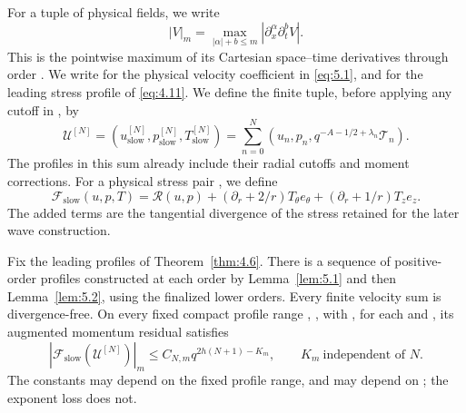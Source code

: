 %
For a tuple  of physical fields, we write
\begin{equation}
 |V|_m=\max_{|\alpha|+b\leq m}|\partial_x^\alpha\partial_t^bV|.
 \tag{5.23}\label{eq:5.23}
\end{equation}
This is the pointwise maximum of its Cartesian space--time derivatives through order
. We write
 for the physical velocity
coefficient in \eqref{eq:5.1}, and  for the leading stress profile of
\eqref{eq:4.11}. We define the finite tuple, before applying any cutoff in
, by
\[
 \mathcal U^{[N]}=
 (u_{\mathrm{slow}}^{[N]},p_{\mathrm{slow}}^{[N]},T_{\mathrm{slow}}^{[N]})
 =\sum_{n=0}^{N}(u_n,p_n,q^{-A-1/2+\lambda_n}\mathcal T_n).
\]
The profiles in this sum already include their radial cutoffs and moment corrections. For a
physical stress pair , we define
\begin{equation}
 \mathcal F_{\mathrm{slow}}(u,p,T)=\mathscr R(u,p)
 +(\partial_r+2/r)T_\theta e_\theta+(\partial_r+1/r)T_ze_z.
 \tag{5.24}\label{eq:5.24}
\end{equation}
The added terms are the tangential divergence of the stress retained for the later wave
construction.

\begin{proposition}\label{prop:5.3}
Fix the leading profiles of Theorem~\ref{thm:4.6}. There is a sequence of positive-order profiles
constructed at each order by Lemma~\ref{lem:5.1} and then Lemma~\ref{lem:5.2}, using the finalized
lower orders. Every finite velocity sum  is divergence-free.
On every fixed compact profile range ,
, with , for each
 and , its augmented momentum residual
satisfies
\begin{equation}
 |\mathcal F_{\mathrm{slow}}(\mathcal U^{[N]})|_m
 \leq C_{N,m}q^{2h(N+1)-K_m},
 \qquad K_m\ \text{independent of }N.
 \tag{5.25}\label{eq:5.25}
\end{equation}
The constants may depend on the fixed profile range, and
 may depend on ; the exponent loss
 does not.
\end{proposition}

